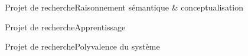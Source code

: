 \begin{frame}{Projet de recherche}{Raisonnement sémantique \& conceptualisation}

\end{frame}

\begin{frame}{Projet de recherche}{Apprentissage}

\end{frame}

\begin{frame}{Projet de recherche}{Polyvalence du système}

\end{frame}